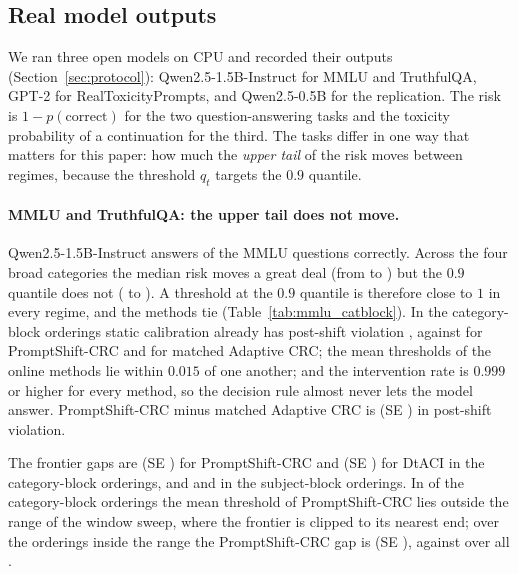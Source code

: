 
\subsection{Real model outputs}\label{sec:res-real}

We ran three open models on CPU and recorded their outputs (Section~\ref{sec:protocol}): Qwen2.5-1.5B-Instruct for MMLU and TruthfulQA, GPT-2 for RealToxicityPrompts, and Qwen2.5-0.5B for the replication. The risk is $1-p(\text{correct})$ for the two question-answering tasks and the toxicity probability of a continuation for the third. The tasks differ in one way that matters for this paper: how much the \emph{upper tail} of the risk moves between regimes, because the threshold $q_t$ targets the $0.9$ quantile.

\paragraph{MMLU and TruthfulQA: the upper tail does not move.}
Qwen2.5-1.5B-Instruct answers \MmluAcc{} of the \MmluN{} MMLU questions correctly. Across the four broad categories the median risk moves a great deal (from \MmluMedLo{} to \MmluMedHi{}) but the $0.9$ quantile does not (\MmluQnineLo{} to \MmluQnineHi{}). A threshold at the $0.9$ quantile is therefore close to $1$ in every regime, and the methods tie (Table~\ref{tab:mmlu_catblock}). In the category-block orderings static calibration already has post-shift violation \MmluCatStaticPost{}, against \MmluCatPSPost{} for PromptShift-CRC and \MmluCatMatchedPost{} for matched Adaptive CRC; the mean thresholds of the online methods lie within $0.015$ of one another; and the intervention rate is $0.999$ or higher for every method, so the decision rule almost never lets the model answer. PromptShift-CRC minus matched Adaptive CRC is \MmluCatPSvsMatchedPost{} (SE \MmluCatPSvsMatchedPostSE{}) in post-shift violation.

The frontier gaps are \MmluCatFrontierPS{} (SE \MmluCatFrontierPSSE{}) for PromptShift-CRC and \MmluCatFrontierDtACI{} (SE \MmluCatFrontierDtACISE{}) for DtACI in the category-block orderings, and \MmluSubjFrontierPS{} and \MmluSubjFrontierDtACI{} in the subject-block orderings. In \MmluCatFrontierPSOutN{} of the \MmluCatFrontierPSAllN{} category-block orderings the mean threshold of PromptShift-CRC lies outside the range of the window sweep, where the frontier is clipped to its nearest end; over the \MmluCatFrontierPSInN{} orderings inside the range the PromptShift-CRC gap is \MmluCatFrontierPSIn{} (SE \MmluCatFrontierPSInSE{}), against \MmluCatFrontierPS{} over all \MmluCatFrontierPSAllN{}.

